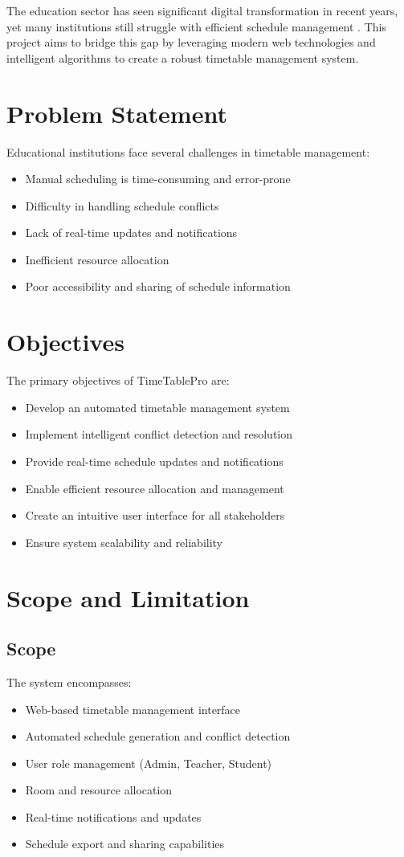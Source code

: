 \documentclass[12pt,a4paper]{report}
\begin{document}
The education sector has seen significant digital transformation in recent years, yet many institutions still struggle with efficient schedule management \cite{scheduling_algorithms}. This project aims to bridge this gap by leveraging modern web technologies and intelligent algorithms to create a robust timetable management system.

\section{Problem Statement}
Educational institutions face several challenges in timetable management:
\begin{itemize}
    \item Manual scheduling is time-consuming and error-prone
    \item Difficulty in handling schedule conflicts
    \item Lack of real-time updates and notifications
    \item Inefficient resource allocation
    \item Poor accessibility and sharing of schedule information
\end{itemize}

\section{Objectives}
The primary objectives of TimeTablePro are:
\begin{itemize}
    \item Develop an automated timetable management system
    \item Implement intelligent conflict detection and resolution
    \item Provide real-time schedule updates and notifications
    \item Enable efficient resource allocation and management
    \item Create an intuitive user interface for all stakeholders
    \item Ensure system scalability and reliability
\end{itemize}

\section{Scope and Limitation}
\subsection{Scope}
The system encompasses:
\begin{itemize}
    \item Web-based timetable management interface
    \item Automated schedule generation and conflict detection
    \item User role management (Admin, Teacher, Student)
    \item Room and resource allocation
    \item Real-time notifications and updates
    \item Schedule export and sharing capabilities
\end{itemize}
\end{document}
